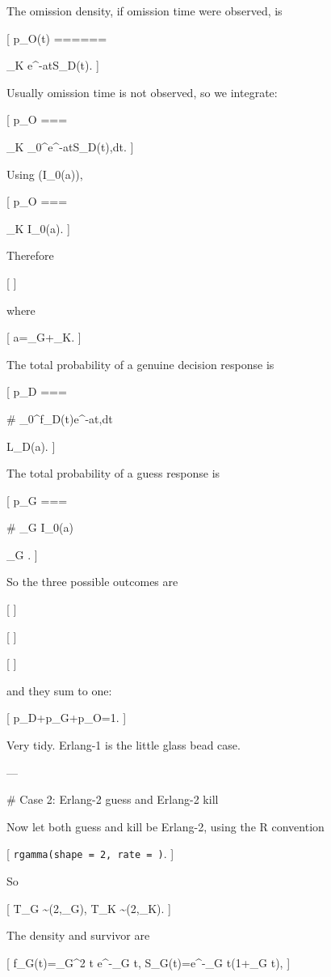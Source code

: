 The omission density, if omission time were observed, is

[
p_O(t)
======

\lambda_K e^{-at}S_D(t).
]

Usually omission time is not observed, so we integrate:

[
p_O
===

\lambda_K
\int_0^\infty e^{-at}S_D(t),dt.
]

Using (I_0(a)),

[
p_O
===

\lambda_K I_0(a).
]

Therefore

[
]

where

[
a=\lambda_G+\lambda_K.
]

The total probability of a genuine decision response is

[
p_D
===

# \int_0^\infty f_D(t)e^{-at},dt

L_D(a).
]

The total probability of a guess response is

[
p_G
===

# \lambda_G I_0(a)

\lambda_G
.
]

So the three possible outcomes are

[
]

[
]

[
]

and they sum to one:

[
p_D+p_G+p_O=1.
]

Very tidy. Erlang-1 is the little glass bead case.

---

# Case 2: Erlang-2 guess and Erlang-2 kill

Now let both guess and kill be Erlang-2, using the R convention

[
\texttt{rgamma(shape = 2, rate = }\lambda\texttt{)}.
]

So

[
T_G \sim {}(2,\lambda_G),
\qquad
T_K \sim {}(2,\lambda_K).
]

The density and survivor are

[
f_G(t)=\lambda_G^2 t e^{-\lambda_G t},
\qquad
S_G(t)=e^{-\lambda_G t}(1+\lambda_G t),
]

